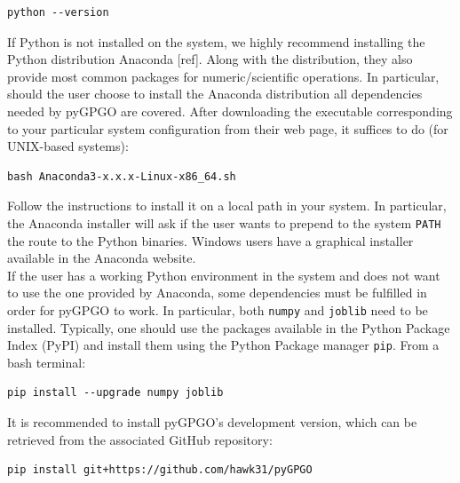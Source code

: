 \documentclass[10pt,a4paper,twoside]{book}
\begin{document}
\begin{verbatim}
python --version   
\end{verbatim}

If Python is not installed on the system, we highly recommend installing the Python distribution Anaconda [ref]. Along with the distribution, they also provide most common packages for numeric/scientific operations. In particular, should the user choose to install the Anaconda distribution all dependencies needed by pyGPGO are covered. After downloading the executable corresponding to your particular system configuration from their web page, it suffices to do (for UNIX-based systems):

\begin{verbatim}
bash Anaconda3-x.x.x-Linux-x86_64.sh
\end{verbatim}

Follow the instructions to install it on a local path in your system. In particular, the Anaconda installer will ask if the user wants to prepend to the system \texttt{PATH} the route to the Python binaries. Windows users have a graphical installer available in the Anaconda website.\\

If the user has a working Python environment in the system and does not want to use the one provided by Anaconda, some dependencies must be fulfilled in order for pyGPGO to work. In particular, both \texttt{numpy} and \texttt{joblib} need to be installed. Typically, one should use the packages available in the Python Package Index (PyPI) and install them using the Python Package manager \texttt{pip}. From a bash terminal:

\begin{verbatim}
pip install --upgrade numpy joblib            
\end{verbatim}


It is recommended to install pyGPGO's development version, which can be retrieved from the associated GitHub repository:

\begin{verbatim}
pip install git+https://github.com/hawk31/pyGPGO          
\end{verbatim}
\end{document}
